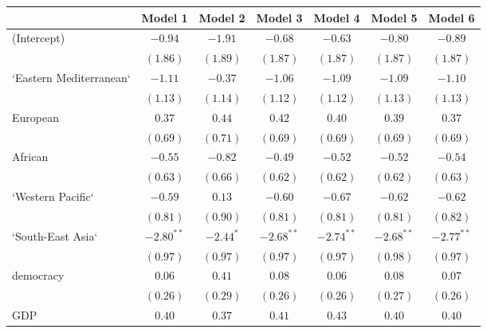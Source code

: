 
\begin{table}[!h]
\begin{center}
\begin{tabular}{l c c c c c c }
\toprule
 & Model 1 & Model 2 & Model 3 & Model 4 & Model 5 & Model 6 \\
\midrule
(Intercept)             & $-0.94$      & $-1.91$      & $-0.68$      & $-0.63$      & $-0.80$      & $-0.89$      \\
                        & $(1.86)$     & $(1.89)$     & $(1.87)$     & $(1.87)$     & $(1.87)$     & $(1.87)$     \\
`Eastern Mediterranean` & $-1.11$      & $-0.37$      & $-1.06$      & $-1.09$      & $-1.09$      & $-1.10$      \\
                        & $(1.13)$     & $(1.14)$     & $(1.12)$     & $(1.12)$     & $(1.13)$     & $(1.13)$     \\
European                & $0.37$       & $0.44$       & $0.42$       & $0.40$       & $0.39$       & $0.37$       \\
                        & $(0.69)$     & $(0.71)$     & $(0.69)$     & $(0.69)$     & $(0.69)$     & $(0.69)$     \\
African                 & $-0.55$      & $-0.82$      & $-0.49$      & $-0.52$      & $-0.52$      & $-0.54$      \\
                        & $(0.63)$     & $(0.66)$     & $(0.62)$     & $(0.62)$     & $(0.62)$     & $(0.63)$     \\
`Western Pacific`       & $-0.59$      & $0.13$       & $-0.60$      & $-0.67$      & $-0.62$      & $-0.62$      \\
                        & $(0.81)$     & $(0.90)$     & $(0.81)$     & $(0.81)$     & $(0.81)$     & $(0.82)$     \\
`South-East Asia`       & $-2.80^{**}$ & $-2.44^{*}$  & $-2.68^{**}$ & $-2.74^{**}$ & $-2.68^{**}$ & $-2.77^{**}$ \\
                        & $(0.97)$     & $(0.97)$     & $(0.97)$     & $(0.97)$     & $(0.98)$     & $(0.97)$     \\
democracy               & $0.06$       & $0.41$       & $0.08$       & $0.06$       & $0.08$       & $0.07$       \\
                        & $(0.26)$     & $(0.29)$     & $(0.26)$     & $(0.26)$     & $(0.27)$     & $(0.26)$     \\
GDP                     & $0.40$       & $0.37$       & $0.41$       & $0.43$       & $0.40$       & $0.40$       \\

\end{tabular}
\end{center}
\end{table}
